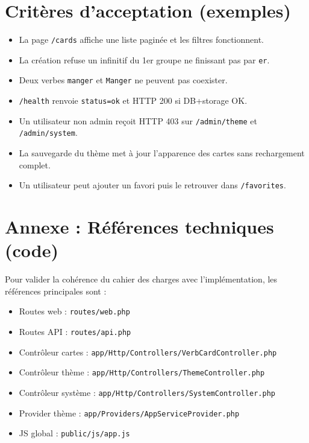 \documentclass[12pt,a4paper]{article}
\begin{document}
\section{Critères d'acceptation (exemples)}
\begin{itemize}[leftmargin=*]
  \item La page \texttt{/cards} affiche une liste paginée et les filtres fonctionnent.
  \item La création refuse un infinitif du 1er groupe ne finissant pas par \texttt{er}.
  \item Deux verbes \texttt{manger} et \texttt{Manger} ne peuvent pas coexister.
  \item \texttt{/health} renvoie \texttt{status=ok} et HTTP 200 si DB+storage OK.
  \item Un utilisateur non admin reçoit HTTP 403 sur \texttt{/admin/theme} et \texttt{/admin/system}.
  \item La sauvegarde du thème met à jour l'apparence des cartes sans rechargement complet.
  \item Un utilisateur peut ajouter un favori puis le retrouver dans \texttt{/favorites}.
\end{itemize}

\section{Annexe : Références techniques (code)}
Pour valider la cohérence du cahier des charges avec l'implémentation, les références principales sont :
\begin{itemize}[leftmargin=*]
  \item Routes web : \texttt{routes/web.php}
  \item Routes API : \texttt{routes/api.php}
  \item Contrôleur cartes : \texttt{app/Http/Controllers/VerbCardController.php}
  \item Contrôleur thème : \texttt{app/Http/Controllers/ThemeController.php}
  \item Contrôleur système : \texttt{app/Http/Controllers/SystemController.php}
  \item Provider thème : \texttt{app/Providers/AppServiceProvider.php}
  \item JS global : \texttt{public/js/app.js}
\end{itemize}
\end{document}
